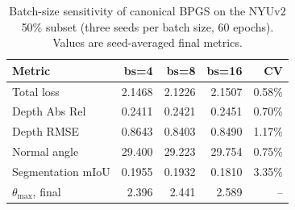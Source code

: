 \begin{table}[t]
\centering
\caption{Batch-size sensitivity of canonical BPGS on the NYUv2 50\% subset (three seeds per batch size, 60 epochs). Values are seed-averaged final metrics.}
\label{tab:batch_size}
\small
\begin{tabular}{lrrrr}
\toprule
Metric & bs=4 & bs=8 & bs=16 & CV \\
\midrule
Total loss & 2.1468 & 2.1226 & 2.1507 & 0.58\% \\
Depth Abs Rel & 0.2411 & 0.2421 & 0.2451 & 0.70\% \\
Depth RMSE & 0.8643 & 0.8403 & 0.8490 & 1.17\% \\
Normal angle & 29.400 & 29.223 & 29.754 & 0.75\% \\
Segmentation mIoU & 0.1955 & 0.1932 & 0.1810 & 3.35\% \\
$\theta_{\max}$, final & 2.396 & 2.441 & 2.589 & -- \\
\bottomrule
\end{tabular}
\end{table}
